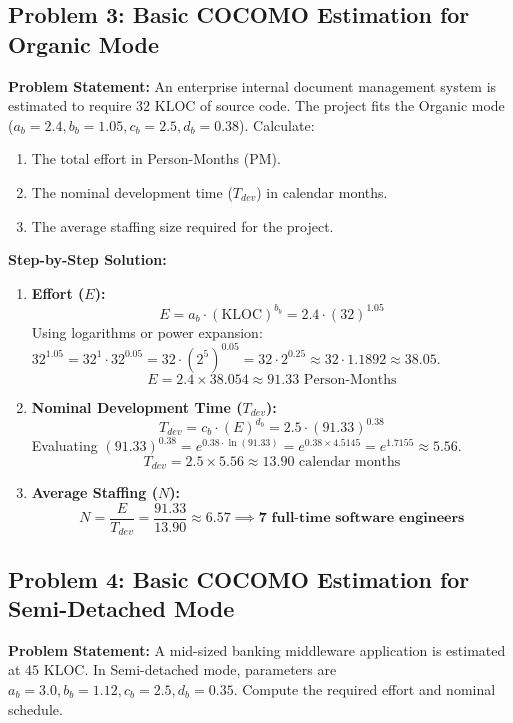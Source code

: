 \subsection*{Problem 3: Basic COCOMO Estimation for Organic Mode}
\textbf{Problem Statement:} An enterprise internal document management system is estimated to require $32\text{ KLOC}$ of source code. The project fits the Organic mode ($a_b = 2.4, b_b = 1.05, c_b = 2.5, d_b = 0.38$). Calculate:
\begin{enumerate}[label=(\alph*)]
    \item The total effort in Person-Months (PM).
    \item The nominal development time ($T_{dev}$) in calendar months.
    \item The average staffing size required for the project.
\end{enumerate}

\textbf{Step-by-Step Solution:}
\begin{enumerate}[label=(\alph*)]
    \item \textbf{Effort ($E$):}
    \[
    E = a_b \cdot (\text{KLOC})^{b_b} = 2.4 \cdot (32)^{1.05}
    \]
    Using logarithms or power expansion: $32^{1.05} = 32^1 \cdot 32^{0.05} = 32 \cdot (2^5)^{0.05} = 32 \cdot 2^{0.25} \approx 32 \cdot 1.1892 \approx 38.05$.
    \[
    E = 2.4 \times 38.054 \approx 91.33\text{ Person-Months}
    \]
    \item \textbf{Nominal Development Time ($T_{dev}$):}
    \[
    T_{dev} = c_b \cdot (E)^{d_b} = 2.5 \cdot (91.33)^{0.38}
    \]
    Evaluating $(91.33)^{0.38} = e^{0.38 \cdot \ln(91.33)} = e^{0.38 \times 4.5145} = e^{1.7155} \approx 5.56$.
    \[
    T_{dev} = 2.5 \times 5.56 \approx 13.90\text{ calendar months}
    \]
    \item \textbf{Average Staffing ($N$):}
    \[
    N = \frac{E}{T_{dev}} = \frac{91.33}{13.90} \approx 6.57 \implies \mathbf{7\text{ full-time software engineers}}
    \]
\end{enumerate}

\subsection*{Problem 4: Basic COCOMO Estimation for Semi-Detached Mode}
\textbf{Problem Statement:} A mid-sized banking middleware application is estimated at $45\text{ KLOC}$. In Semi-detached mode, parameters are $a_b = 3.0, b_b = 1.12, c_b = 2.5, d_b = 0.35$. Compute the required effort and nominal schedule.

